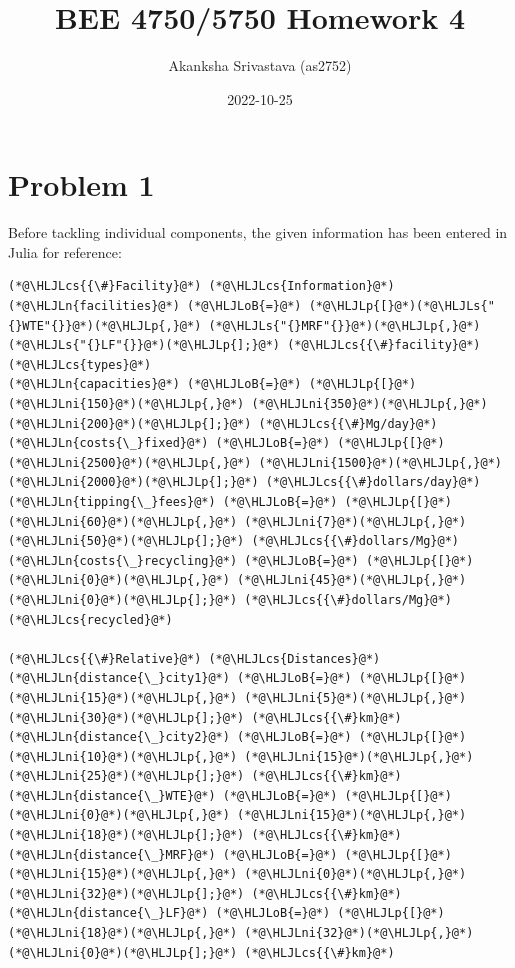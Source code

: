 \documentclass[12pt,a4paper]{article}
\title{ BEE 4750/5750 Homework 4 }
\author{ Akanksha Srivastava (as2752) }
\date{ 2022-10-25 }
\newcommand{\HLJLn}[1]{#1}
\newcommand{\HLJLs}[1]{\textcolor[RGB]{201,61,57}{#1}}
\newcommand{\HLJLni}[1]{\textcolor[RGB]{59,151,46}{#1}}
\newcommand{\HLJLoB}[1]{\textcolor[RGB]{102,102,102}{\textbf{#1}}}
\newcommand{\HLJLp}[1]{#1}
\newcommand{\HLJLcs}[1]{\textcolor[RGB]{153,153,119}{\textit{#1}}}
\begin{document}
\maketitle



\section{Problem 1}
Before tackling individual components, the given information has been entered in Julia for reference:


\begin{lstlisting}
(*@\HLJLcs{{\#}Facility}@*) (*@\HLJLcs{Information}@*)
(*@\HLJLn{facilities}@*) (*@\HLJLoB{=}@*) (*@\HLJLp{[}@*)(*@\HLJLs{"{}WTE"{}}@*)(*@\HLJLp{,}@*) (*@\HLJLs{"{}MRF"{}}@*)(*@\HLJLp{,}@*) (*@\HLJLs{"{}LF"{}}@*)(*@\HLJLp{];}@*) (*@\HLJLcs{{\#}facility}@*) (*@\HLJLcs{types}@*)
(*@\HLJLn{capacities}@*) (*@\HLJLoB{=}@*) (*@\HLJLp{[}@*)(*@\HLJLni{150}@*)(*@\HLJLp{,}@*) (*@\HLJLni{350}@*)(*@\HLJLp{,}@*) (*@\HLJLni{200}@*)(*@\HLJLp{];}@*) (*@\HLJLcs{{\#}Mg/day}@*)
(*@\HLJLn{costs{\_}fixed}@*) (*@\HLJLoB{=}@*) (*@\HLJLp{[}@*)(*@\HLJLni{2500}@*)(*@\HLJLp{,}@*) (*@\HLJLni{1500}@*)(*@\HLJLp{,}@*) (*@\HLJLni{2000}@*)(*@\HLJLp{];}@*) (*@\HLJLcs{{\#}dollars/day}@*)
(*@\HLJLn{tipping{\_}fees}@*) (*@\HLJLoB{=}@*) (*@\HLJLp{[}@*)(*@\HLJLni{60}@*)(*@\HLJLp{,}@*) (*@\HLJLni{7}@*)(*@\HLJLp{,}@*) (*@\HLJLni{50}@*)(*@\HLJLp{];}@*) (*@\HLJLcs{{\#}dollars/Mg}@*)
(*@\HLJLn{costs{\_}recycling}@*) (*@\HLJLoB{=}@*) (*@\HLJLp{[}@*)(*@\HLJLni{0}@*)(*@\HLJLp{,}@*) (*@\HLJLni{45}@*)(*@\HLJLp{,}@*) (*@\HLJLni{0}@*)(*@\HLJLp{];}@*) (*@\HLJLcs{{\#}dollars/Mg}@*) (*@\HLJLcs{recycled}@*)

(*@\HLJLcs{{\#}Relative}@*) (*@\HLJLcs{Distances}@*)
(*@\HLJLn{distance{\_}city1}@*) (*@\HLJLoB{=}@*) (*@\HLJLp{[}@*)(*@\HLJLni{15}@*)(*@\HLJLp{,}@*) (*@\HLJLni{5}@*)(*@\HLJLp{,}@*) (*@\HLJLni{30}@*)(*@\HLJLp{];}@*) (*@\HLJLcs{{\#}km}@*)
(*@\HLJLn{distance{\_}city2}@*) (*@\HLJLoB{=}@*) (*@\HLJLp{[}@*)(*@\HLJLni{10}@*)(*@\HLJLp{,}@*) (*@\HLJLni{15}@*)(*@\HLJLp{,}@*) (*@\HLJLni{25}@*)(*@\HLJLp{];}@*) (*@\HLJLcs{{\#}km}@*)
(*@\HLJLn{distance{\_}WTE}@*) (*@\HLJLoB{=}@*) (*@\HLJLp{[}@*)(*@\HLJLni{0}@*)(*@\HLJLp{,}@*) (*@\HLJLni{15}@*)(*@\HLJLp{,}@*) (*@\HLJLni{18}@*)(*@\HLJLp{];}@*) (*@\HLJLcs{{\#}km}@*)
(*@\HLJLn{distance{\_}MRF}@*) (*@\HLJLoB{=}@*) (*@\HLJLp{[}@*)(*@\HLJLni{15}@*)(*@\HLJLp{,}@*) (*@\HLJLni{0}@*)(*@\HLJLp{,}@*) (*@\HLJLni{32}@*)(*@\HLJLp{];}@*) (*@\HLJLcs{{\#}km}@*)
(*@\HLJLn{distance{\_}LF}@*) (*@\HLJLoB{=}@*) (*@\HLJLp{[}@*)(*@\HLJLni{18}@*)(*@\HLJLp{,}@*) (*@\HLJLni{32}@*)(*@\HLJLp{,}@*) (*@\HLJLni{0}@*)(*@\HLJLp{];}@*) (*@\HLJLcs{{\#}km}@*)


\end{lstlisting}
\end{document}
